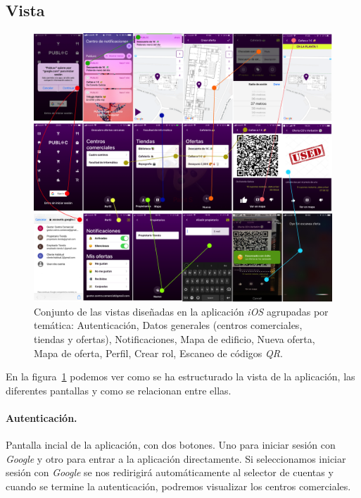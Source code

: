 \subsection{Vista}

\begin{figure}[t]
\includegraphics[width=\textwidth]{figures/esquema2.png}
\captionsetup{singlelinecheck=off,font=footnotesize}
\caption[Conjunto de las vistas diseñadas en la aplicación \emph{iOS} agrupadas por temática.]{Conjunto de las vistas diseñadas en la aplicación \emph{iOS} agrupadas por temática:
 Autenticación,
 Datos generales (centros comerciales, tiendas y ofertas), 
 Notificaciones,
 Mapa de edificio, 
 Nueva oferta,
 Mapa de oferta,
 Perfil,
 Crear rol,
 Escaneo de códigos \textit{QR}.\label{fig:esquema2}}
\end{figure}

En la figura~\ref{fig:esquema2} podemos ver como se ha estructurado la vista de la aplicación, las diferentes pantallas y como se relacionan entre ellas.

\paragraph{Autenticación.} Pantalla incial de la aplicación, con dos botones. Uno para iniciar sesión con \textit{Google} y otro para entrar a la aplicación directamente. Si seleccionamos iniciar sesión con \textit{Google} se nos redirigirá automáticamente al selector de cuentas y cuando se termine la autenticación, podremos visualizar los centros comerciales.

